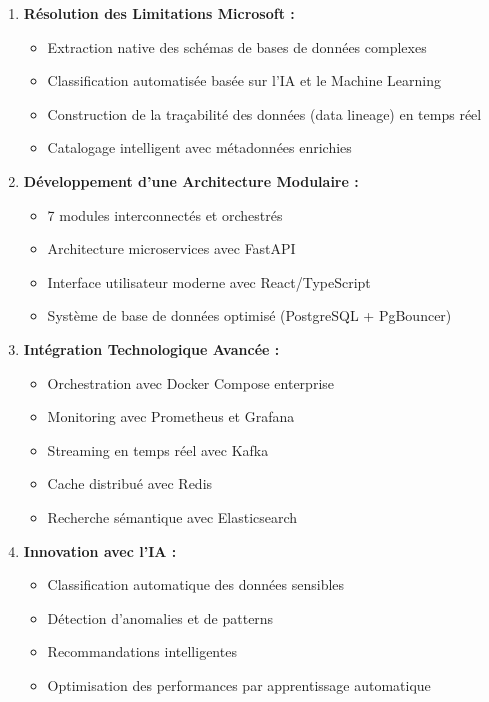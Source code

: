 \documentclass[a4paper,12pt]{article}
\begin{document}
\begin{enumerate}
    \item \textbf{Résolution des Limitations Microsoft :}
    \begin{itemize}
        \item Extraction native des schémas de bases de données complexes
        \item Classification automatisée basée sur l'IA et le Machine Learning
        \item Construction de la traçabilité des données (data lineage) en temps réel
        \item Catalogage intelligent avec métadonnées enrichies
    \end{itemize}
    
    \item \textbf{Développement d'une Architecture Modulaire :}
    \begin{itemize}
        \item 7 modules interconnectés et orchestrés
        \item Architecture microservices avec FastAPI
        \item Interface utilisateur moderne avec React/TypeScript
        \item Système de base de données optimisé (PostgreSQL + PgBouncer)
    \end{itemize}
    
    \item \textbf{Intégration Technologique Avancée :}
    \begin{itemize}
        \item Orchestration avec Docker Compose enterprise
        \item Monitoring avec Prometheus et Grafana
        \item Streaming en temps réel avec Kafka
        \item Cache distribué avec Redis
        \item Recherche sémantique avec Elasticsearch
    \end{itemize}
    
    \item \textbf{Innovation avec l'IA :}
    \begin{itemize}
        \item Classification automatique des données sensibles
        \item Détection d'anomalies et de patterns
        \item Recommandations intelligentes
        \item Optimisation des performances par apprentissage automatique
    \end{itemize}
\end{enumerate}
\end{document}
